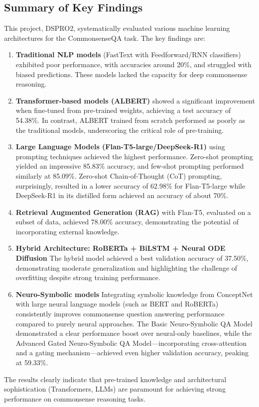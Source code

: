 \documentclass[10.5pt]{article}
\begin{document}
\subsection{Summary of Key Findings}
This project, DSPRO2, systematically evaluated various machine learning architectures for the CommonsenseQA task. The key findings are:
\begin{enumerate}
    \item \textbf{Traditional NLP models} (FastText with Feedforward/RNN classifiers) exhibited poor performance, with accuracies around 20\%, and struggled with biased predictions. These models lacked the capacity for deep commonsense reasoning.
    \item \textbf{Transformer-based models (ALBERT)} showed a significant improvement when fine-tuned from pre-trained weights, achieving a test accuracy of 54.38\%. In contrast, ALBERT trained from scratch performed as poorly as the traditional models, underscoring the critical role of pre-training.
    \item \textbf{Large Language Models (Flan-T5-large/DeepSeek-R1)} using prompting techniques achieved the highest performance. Zero-shot prompting yielded an impressive 85.83\% accuracy, and few-shot prompting performed similarly at 85.09\%. Zero-shot Chain-of-Thought (CoT) prompting, surprisingly, resulted in a lower accuracy of 62.98\% for Flan-T5-large while DeepSeek-R1 in its distilled form achieved an accuracy of about 70\%.
    \item \textbf{Retrieval Augmented Generation (RAG)} with Flan-T5, evaluated on a subset of data, achieved 78.00\% accuracy, demonstrating the potential of incorporating external knowledge.
    \item \textbf{Hybrid Architecture: RoBERTa + BiLSTM + Neural ODE Diffusion} The hybrid model achieved a best validation accuracy of 37.50\%, demonstrating moderate generalization and highlighting the challenge of overfitting despite strong training performance.
    \item \textbf{Neuro-Symbolic models} Integrating symbolic knowledge from ConceptNet with large neural language models (such as BERT and RoBERTa) consistently improves commonsense question answering performance compared to purely neural approaches. The Basic Neuro-Symbolic QA Model demonstrated a clear performance boost over neural-only baselines, while the Advanced Gated Neuro-Symbolic QA Model—incorporating cross-attention and a gating mechanism—achieved even higher validation accuracy, peaking at 59.33\%.
\end{enumerate}
The results clearly indicate that pre-trained knowledge and architectural sophistication (Transformers, LLMs) are paramount for achieving strong performance on commonsense reasoning tasks.
\end{document}
